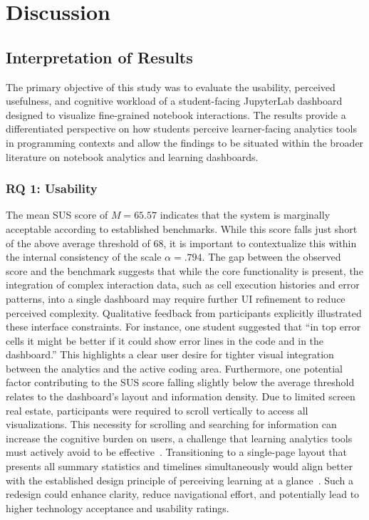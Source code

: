 \section{Discussion}
\subsection{Interpretation of Results}
The primary objective of this study was to evaluate the usability, perceived usefulness, and cognitive workload of a student-facing JupyterLab dashboard designed to visualize fine-grained notebook interactions. The results provide a differentiated perspective on how students perceive learner-facing analytics tools in programming contexts and allow the findings to be situated within the broader literature on notebook analytics and learning dashboards.
\subsubsection{RQ 1: Usability}
The mean SUS score of $M=65.57$ indicates that the system is marginally acceptable according to established benchmarks. While this score falls just short of the above average threshold of 68, it is important to contextualize this within the internal consistency of the scale $\alpha=.794$. The gap between the observed score and the benchmark suggests that while the core functionality is present, the integration of complex interaction data, such as cell execution histories and error patterns, into a single dashboard may require further UI refinement to reduce perceived complexity. Qualitative feedback from participants explicitly illustrated these interface constraints. For instance, one student suggested that ``in top error cells it might be better if it could show error lines in the code and in the dashboard.'' This highlights a clear user desire for tighter visual integration between the analytics and the active coding area. Furthermore, one potential factor contributing to the SUS score falling slightly below the average threshold relates to the dashboard's layout and information density. Due to limited screen real estate, participants were required to scroll vertically to access all visualizations. This necessity for scrolling and searching for information can increase the cognitive burden on users, a challenge that learning analytics tools must actively avoid to be effective~\cite{corrin2014exploring}. Transitioning to a single-page layout that presents all summary statistics and timelines simultaneously would align better with the established design principle of perceiving learning at a glance~\cite{schwendimann2016perceiving}. Such a redesign could enhance clarity, reduce navigational effort, and potentially lead to higher technology acceptance and usability ratings.


